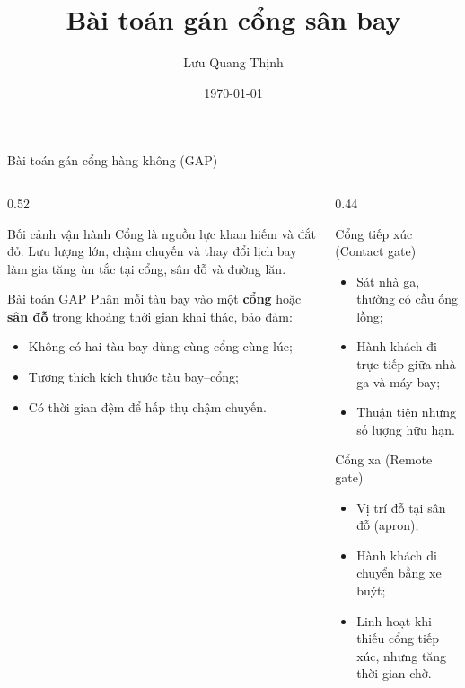 \documentclass[aspectratio=169,10pt]{beamer}
\title{Bài toán gán cổng sân bay}
\subtitle{}
\author{Lưu Quang Thịnh}
\institute{
SATLab - UET\\
GV: ThS. Kiều Văn Tuyên
}
\date{\today}
\begin{document}
\begin{frame}
  \titlepage
\end{frame}


\begin{frame}[t]{Bài toán gán cổng hàng không (GAP)}

\footnotesize
\begin{columns}[T,onlytextwidth]
\begin{column}{0.52\textwidth}

\begin{block}{Bối cảnh vận hành}
Cổng là nguồn lực \alert{khan hiếm và đắt đỏ}. Lưu lượng lớn,
chậm chuyến và thay đổi lịch bay làm gia tăng ùn tắc tại cổng,
sân đỗ và đường lăn.
\end{block}

\begin{block}{Bài toán GAP}
Phân mỗi tàu bay vào một \textbf{cổng} hoặc \textbf{sân đỗ}
trong khoảng thời gian khai thác, bảo đảm:
\begin{itemize}
    \setlength{\itemsep}{1pt}
    \item Không có hai tàu bay dùng cùng cổng cùng lúc;
    \item Tương thích kích thước tàu bay--cổng;
    \item Có thời gian đệm để hấp thụ chậm chuyến.
\end{itemize}
\end{block}

\end{column}
\begin{column}{0.44\textwidth}

\begin{alertblock}{Cổng tiếp xúc (Contact gate)}
\begin{itemize}
    \setlength{\itemsep}{1pt}
    \item Sát nhà ga, thường có cầu ống lồng;
    \item Hành khách đi trực tiếp giữa nhà ga và máy bay;
    \item Thuận tiện nhưng số lượng hữu hạn.
\end{itemize}
\end{alertblock}

\begin{exampleblock}{Cổng xa (Remote gate)}
\begin{itemize}
    \setlength{\itemsep}{1pt}
    \item Vị trí đỗ tại sân đỗ (apron);
    \item Hành khách di chuyển bằng xe buýt;
    \item Linh hoạt khi thiếu cổng tiếp xúc, nhưng tăng thời gian chờ.
\end{itemize}
\end{exampleblock}


\end{column}
\end{columns}
\end{frame}
\end{document}

